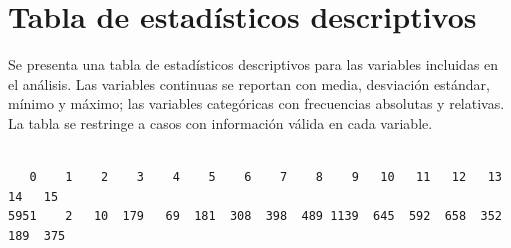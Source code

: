\documentclass[
  spanish,
  a4paper,
  oneside]{scrbook}
\newenvironment{Shaded}{\begin{snugshade}}{\end{snugshade}}
\newcommand{\AttributeTok}[1]{\textcolor[rgb]{0.40,0.45,0.13}{#1}}
\newcommand{\CommentTok}[1]{\textcolor[rgb]{0.37,0.37,0.37}{#1}}
\newcommand{\FunctionTok}[1]{\textcolor[rgb]{0.28,0.35,0.67}{#1}}
\newcommand{\NormalTok}[1]{\textcolor[rgb]{0.00,0.23,0.31}{#1}}
\newcommand{\OtherTok}[1]{\textcolor[rgb]{0.00,0.23,0.31}{#1}}
\newcommand{\SpecialCharTok}[1]{\textcolor[rgb]{0.37,0.37,0.37}{#1}}
\newcommand{\StringTok}[1]{\textcolor[rgb]{0.13,0.47,0.30}{#1}}
\begin{document}
\chapter{Tabla de estadísticos
descriptivos}\label{tabla-de-estaduxedsticos-descriptivos}

Se presenta una tabla de estadísticos descriptivos para las variables
incluidas en el análisis. Las variables continuas se reportan con media,
desviación estándar, mínimo y máximo; las variables categóricas con
frecuencias absolutas y relativas. La tabla se restringe a casos con
información válida en cada variable.

\begin{Shaded}
\end{Shaded}

\begin{verbatim}

   0    1    2    3    4    5    6    7    8    9   10   11   12   13   14   15 
5951    2   10  179   69  181  308  398  489 1139  645  592  658  352  189  375 
\end{verbatim}
\end{document}
